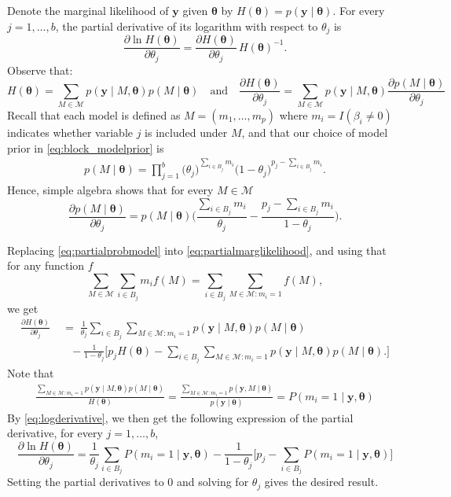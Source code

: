 \documentclass[
  12pt]{article}
\newcommand{\M}{\mathcal{M}}
\newcommand{\by}{\mathbf{y}}
\newcommand{\btheta}{\boldsymbol{\theta}}
\begin{document}
Denote the marginal likelihood of $\by$ given $\btheta$ by $H(\btheta)=p(\by \mid \btheta)$. For every $j=1,\ldots,b$, the partial derivative of its logarithm with respect to $\theta_j$ is
    \begin{equation}\label{eq:logderivative}
        \frac{\partial \ln H(\btheta)}{\partial \theta_j}=\frac{\partial H(\btheta)}{\partial \theta_j}\,H(\btheta)^{-1}.
    \end{equation}
    Observe that:
    \begin{equation}\label{eq:partialmarglikelihood}
    H(\btheta)=\sum_{M \in \M}p(\by \mid M,\btheta)p(M \mid \btheta)
    \quad \text{and}\quad 
    \frac{\partial H(\btheta)}{\partial \theta_j}=\sum_{M\in \M}p(\by \mid M,\btheta)\frac{\partial p(M \mid \btheta)}{\partial \theta_j}
    \end{equation}
    Recall that each model is defined as $M=(m_1,\ldots,m_p)$ where $m_i = I(\beta_i \neq 0)$ indicates whether variable $j$ is included under $M$, and that our choice of model prior in \eqref{eq:block_modelprior} is 
    \begin{align}
        p( M \mid \btheta)=
        \prod_{j=1}^b \big(\theta_j\big)^{\sum_{i \in B_j} m_i}
        \big(1 - \theta_j\big)^{p_j - \sum_{i \in B_j} m_i}.
        \nonumber
    \end{align}
    Hence, simple algebra shows that for every $M\in \mathcal M$
    \begin{equation}\label{eq:partialprobmodel}
    \frac{\partial p(M \mid \btheta)}{\partial \theta_j}= p(M \mid \btheta) \bigg(\frac{\sum_{i\in B_j}m_i}{\theta_j}-\frac{p_j-\sum_{i\in B_j}m_i}{1-\theta_j} \bigg).       
    \end{equation}
    
    Replacing \eqref{eq:partialprobmodel} into \eqref{eq:partialmarglikelihood}, and using that for any function $f$ $$\sum_{M\in \M}\sum_{i\in B_j}m_if(M)=\sum_{i\in B_j}\sum_{M\in \M:m_i=1}f(M),$$ we get
    \begin{align}\label{eq:partialmarglikelihood2}
        \frac{\partial H(\btheta)}{\partial \theta_j}&\;=\;\frac{1}{\theta_j}\sum_{i \in B_j}\sum_{M\in \M: m_i=1}p(\by \mid M,\btheta)p(M \mid \btheta) \\&\quad- \frac{1}{1-\theta_j}\bigg[p_j H(\btheta)-\sum_{i \in B_j}\sum_{M\in \M: m_i=1}p(\by \mid M,\btheta)p(M \mid \btheta). \nonumber
        \bigg]
    \end{align}
    Note that
    \begin{align*}
        \frac{\sum_{M\in \M: m_i=1}p(\by \mid M,\btheta)p(M \mid \btheta)}{H(\btheta)} = \frac{\sum_{M\in \M: m_i=1}p(\by , M\mid \btheta)}{p(\by \mid \btheta)}= P(m_i = 1\mid \by,\btheta)
    \end{align*}
    By \eqref{eq:logderivative}, we then get the following expression of the partial derivative, for every $j=1,\ldots,b$,
    $$\frac{\partial \ln H(\btheta)}{\partial \theta_j}=\frac{1}{\theta_j}\sum_{i \in B_j}P(m_i = 1\mid \by,\btheta) - \frac{1}{1-\theta_j}\bigg[p_j-\sum_{i \in B_j}P(m_i = 1\mid \by,\btheta)
        \bigg]$$
    Setting the partial derivatives to 0 and solving for $\theta_j$ gives the desired result.
\end{document}
